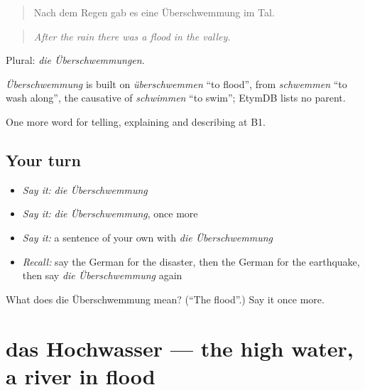 \begin{quote}
Nach dem Regen gab es eine Überschwemmung im Tal.
\end{quote}

\begin{quote}
\emph{After the rain there was a flood in the valley.}
\end{quote}

Plural: \emph{die Überschwemmungen}.

\begin{cousinweb}
\emph{Überschwemmung} is built on \emph{überschwemmen} \textquotedblleft{}to flood\textquotedblright{}, from \emph{schwemmen} \textquotedblleft{}to wash along\textquotedblright{}, the causative of \emph{schwimmen} \textquotedblleft{}to swim\textquotedblright{}; EtymDB lists no parent.
\end{cousinweb}

\begin{grammarlens}[title={What you've built}]
One more word for telling, explaining and describing at B1.
\end{grammarlens}

\subsection*{Your turn}
\begin{itemize}
\raggedright
  \item \emph{Say it:} \emph{die Überschwemmung}
  \item \emph{Say it:} \emph{die Überschwemmung}, once more
  \item \emph{Say it:} a sentence of your own with \emph{die Überschwemmung}
  \item \emph{Recall:} say the German for the disaster, then the German for the earthquake, then say \emph{die Überschwemmung} again
\end{itemize}

\begin{tcolorbox}[breakable,colback=teal!4,colframe=teal!35!black,title={Before you move on}]
What does die Überschwemmung mean? (\textquotedblleft{}The flood\textquotedblright{}.) Say it once more.
\end{tcolorbox}
\section[das Hochwasser]{das Hochwasser — the high water, a river in flood}

\label{lesson:GE-C294-hochwasser}



